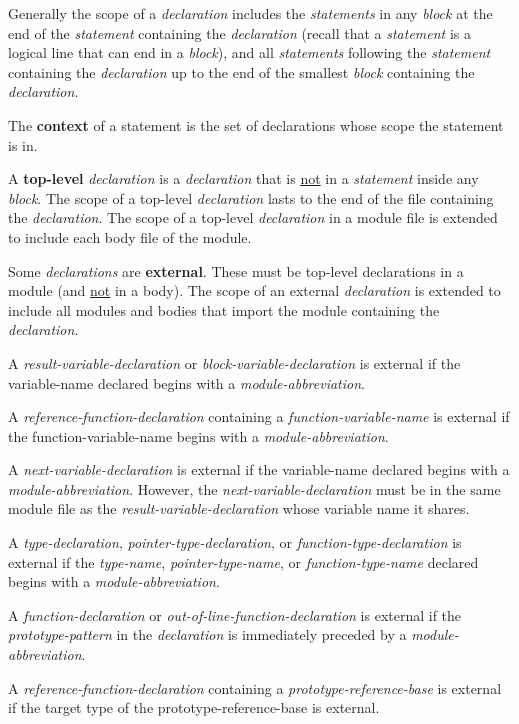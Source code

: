 \documentclass[12pt]{article}
\newcommand{\key}[1]{{\rm \bfseries #1}}
\begin{document}
Generally the scope of a {\em declaration} includes the {\em statements}
in any {\em block} at the end of the {\em statement}
containing the {\em declaration} (recall that a {\em statement} is a
logical line that can end in a {\em block}), and
all {\em statements} following the {\em statement} containing
the {\em declaration} up to the end of the smallest {\em block}
containing the {\em declaration}.

The \key{context}\label{CONTEXT} of a statement is the set of declarations
whose scope the statement is in.

A \key{top-level} {\em declaration} is a {\em declaration} that is
\underline{not} in a {\em statement} inside any {\em block}.
The scope of a top-level {\em declaration} lasts to the end of the
file containing the {\em declaration}.
The scope of a top-level {\em declaration} in a module file is extended
to include each body file of the module.

Some {\em declarations} are \key{external}\label{EXTERNAL}.
These must be top-level declarations in a module (and \underline{not}
in a body).
The scope of an external
{\em declaration} is extended to include all modules and bodies that
import the module containing the {\em declaration}.

A {\em result-variable-declaration} or
{\em block-variable-declaration}
is external if the {variable-name} declared begins with a
{\em module-abbreviation}.

A {\em reference-function-declaration} containing a
{\em function-variable-name}
is external if the {func\-tion-variable-name} begins with a
{\em module-abbreviation}.

A {\em next-variable-declaration}
is external if the {variable-name} declared begins with a
{\em module-abbreviation}.  However, the {\em next-variable-declaration}
must be in the same module file as the {\em result-variable-declaration}
whose variable name it shares.

A {\em type-declaration}, {\em pointer-type-declaration}, or
{\em function-type-declaration}
\label{EXTERNAL-TYPE-NAME}
is external if the {\em type-name}, {\em pointer-type-name},
or {\em function-type-name}
declared begins with a
{\em module-abbrev\-i\-a\-tion}.

A {\em function-declaration}
or {\em out-of-line-function-declar\-a\-tion}
is external\label{EXTERNAL-FUNCTION}
if the {\em prototype-pattern} in the {\em declaration}
is immediately preceded by a {\em module-abbreviation}.

A {\em reference-function-declaration} containing a
{\em prototype-reference-base}
is external if the target type of the {prototype-reference-base} is
external.
\end{document}
